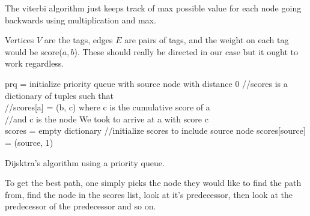 \documentclass{article}
\begin{document}
	The viterbi algorithm just keeps track of max possible value for each node going backwards using multiplication and max. 
	
	Vertices $V$ are the tags, edges $E$ are pairs of tags, and the weight on each tag would be score($a, b$). These should really be directed in our case but it ought to work regardless.
	
	\begin{algorithm}[H]
		 prq = initialize priority queue with source node with distance 0\;
		 //scores is a dictionary of tuples such that \\
	 	//scores[a] = (b, c) where c is  the cumulative score of a\\
	 	//and c is the node We took to arrive at a with score c\\
		 scores = empty dictionary\;
		 //initialize scores to include source node
		 scores[source] = (source, 1)\;
		 \caption{Dijsktra's algorithm using a priority queue.}
	\end{algorithm}
	
	To get the best path, one simply picks the node they would like to find the path from, find the node in the scores list, look at it's predecessor, then look at the predecessor of the predecessor and so on.
	
\end{document}
